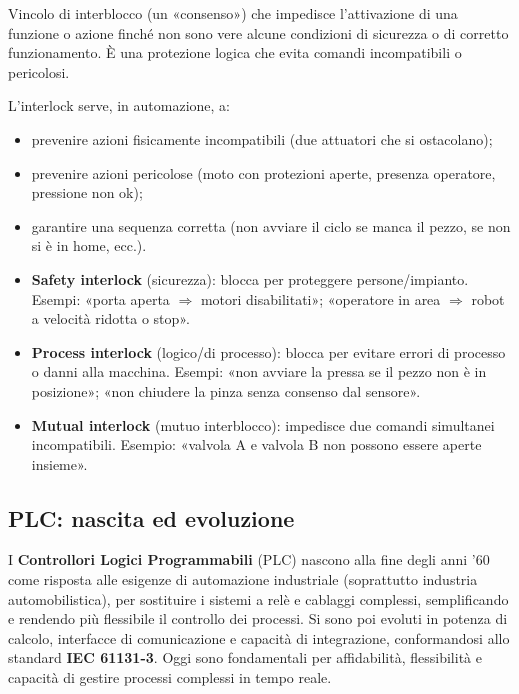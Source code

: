 \begin{defn}[Interlock]
Vincolo di interblocco (un «consenso») che impedisce l'attivazione di una funzione o azione finché non sono vere alcune condizioni di sicurezza o di corretto funzionamento. È una protezione logica che evita comandi incompatibili o pericolosi.
\end{defn}

L'interlock serve, in automazione, a:
\begin{itemize}
    \item prevenire azioni fisicamente incompatibili (due attuatori che si ostacolano);
    \item prevenire azioni pericolose (moto con protezioni aperte, presenza operatore, pressione non ok);
    \item garantire una sequenza corretta (non avviare il ciclo se manca il pezzo, se non si è in home, ecc.).
\end{itemize}

\begin{note}
\begin{itemize}
    \item \textbf{Safety interlock} (sicurezza): blocca per proteggere persone/impianto. Esempi: «porta aperta $\Rightarrow$ motori disabilitati»; «operatore in area $\Rightarrow$ robot a velocità ridotta o stop».
    \item \textbf{Process interlock} (logico/di processo): blocca per evitare errori di processo o danni alla macchina. Esempi: «non avviare la pressa se il pezzo non è in posizione»; «non chiudere la pinza senza consenso dal sensore».
    \item \textbf{Mutual interlock} (mutuo interblocco): impedisce due comandi simultanei incompatibili. Esempio: «valvola A e valvola B non possono essere aperte insieme».
\end{itemize}
\end{note}

\subsection{PLC: nascita ed evoluzione}
I \textbf{Controllori Logici Programmabili} (PLC) nascono alla fine degli anni '60 come risposta alle esigenze di automazione industriale (soprattutto industria automobilistica), per sostituire i sistemi a relè e cablaggi complessi, semplificando e rendendo più flessibile il controllo dei processi. Si sono poi evoluti in potenza di calcolo, interfacce di comunicazione e capacità di integrazione, conformandosi allo standard \textbf{IEC 61131-3}. Oggi sono fondamentali per affidabilità, flessibilità e capacità di gestire processi complessi in tempo reale.

